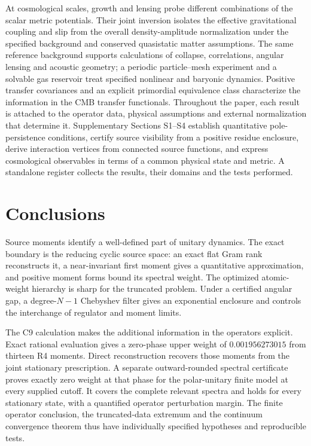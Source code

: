 \documentclass[11pt,a4paper]{article}
\numberwithin{equation}{section}
\begin{document}
At cosmological scales, growth and lensing probe different combinations of the scalar metric potentials. Their joint inversion isolates the effective gravitational coupling and slip from the overall density-amplitude normalization under the specified background and conserved quasistatic matter assumptions. The same reference background supports calculations of collapse, correlations, angular lensing and acoustic geometry; a periodic particle--mesh experiment and a solvable gas reservoir treat specified nonlinear and baryonic dynamics. Positive transfer covariances and an explicit primordial equivalence class characterize the information in the CMB transfer functionals. Throughout the paper, each result is attached to the operator data, physical assumptions and external normalization that determine it. Supplementary Sections S1--S4 establish quantitative pole-persistence conditions, certify source visibility from a positive residue enclosure, derive interaction vertices from connected source functions, and express cosmological observables in terms of a common physical state and metric. A standalone register collects the results, their domains and the tests performed.








\section{Conclusions}
Source moments identify a well-defined part of unitary dynamics. The exact boundary is the reducing cyclic source space: an exact flat Gram rank reconstructs it, a near-invariant first moment gives a quantitative approximation, and positive moment forms bound its spectral weight. The optimized atomic-weight hierarchy is sharp for the truncated problem. Under a certified angular gap, a degree-$N-1$ Chebyshev filter gives an exponential enclosure and controls the interchange of regulator and moment limits.

The C9 calculation makes the additional information in the operators explicit. Exact rational evaluation gives a zero-phase upper weight of $0.001956273015$ from thirteen R4 moments. Direct reconstruction recovers those moments from the joint stationary prescription. A separate outward-rounded spectral certificate proves exactly zero weight at that phase for the polar-unitary finite model at every supplied cutoff. It covers the complete relevant spectra and holds for every stationary state, with a quantified operator perturbation margin. The finite operator conclusion, the truncated-data extremum and the continuum convergence theorem thus have individually specified hypotheses and reproducible tests.
\end{document}
